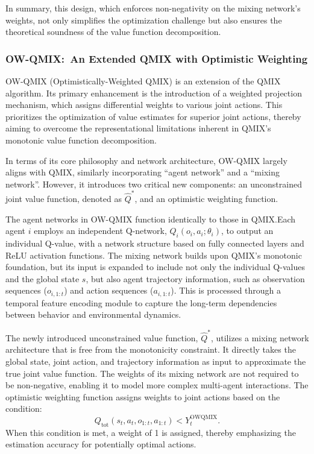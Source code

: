 In summary, this design, which enforces non-negativity on the mixing network's weights, not only simplifies the optimization challenge but also ensures the theoretical soundness of the value function decomposition.

\subsubsection{OW-QMIX:~An Extended QMIX with Optimistic Weighting}

OW-QMIX (Optimistically-Weighted QMIX) is an extension of the QMIX algorithm. Its primary enhancement is the introduction of a weighted projection mechanism, which assigns differential weights to various joint actions. This prioritizes the optimization of value estimates for superior joint actions, thereby aiming to overcome the representational limitations inherent in QMIX's monotonic value function decomposition.

In terms of its core philosophy and network architecture, OW-QMIX largely aligns with QMIX, similarly incorporating ``agent network'' and a ``mixing network''. However, it introduces two critical new components: an unconstrained joint value function, denoted as $\hat{Q}^*$, and an optimistic weighting function.

The agent networks in OW-QMIX function identically to those in QMIX.\@ Each agent $i$ employs an independent Q-network, $Q_i(o_i, a_i; \theta_i)$, to output an individual Q-value, with a network structure based on fully connected layers and ReLU activation functions. The mixing network builds upon QMIX's monotonic foundation, but its input is expanded to include not only the individual Q-values and the global state $s$, but also agent trajectory information, such as observation sequences ($o_{i,1:t}$) and action sequences ($a_{i,1:t}$). This is processed through a temporal feature encoding module to capture the long-term dependencies between behavior and environmental dynamics.

The newly introduced unconstrained value function, $\hat{Q}^*$, utilizes a mixing network architecture that is free from the monotonicity constraint. It directly takes the global state, joint action, and trajectory information as input to approximate the true joint value function. The weights of its mixing network are not required to be non-negative, enabling it to model more complex multi-agent interactions. The optimistic weighting function assigns weights to joint actions based on the condition:
\[
Q_{\text{tot}}(s_t, a_t, o_{1:t}, a_{1:t}) < Y_t^{\text{OWQMIX}}.
\]
When this condition is met, a weight of 1 is assigned, thereby emphasizing the estimation accuracy for potentially optimal actions.

